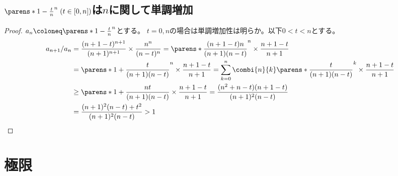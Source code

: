         \subsection{\texorpdfstring{$\parens*{1-\frac{t}{n}}^n\;(t\in[0,n])$}{(1-t/n)\string^n (t∈[0,n])}は\texorpdfstring{$n$}{n}に関して単調増加}
            \label{(1-t/n)^nは単調増加}
            \begin{proof}
                $a_n \coloneq \parens*{1-\frac{t}{n}}^n$とする。
                $t=0,n$の場合は単調増加性は明らか。以下$0<t<n$とする。
                \begin{align*}
                    a_{n+1}/a_n &= \frac{(n+1-t)^{n+1}}{(n+1)^{n+1}}\times\frac{n^n}{(n-t)^n} = \parens*{\frac{(n+1-t)n}{(n+1)(n-t)}}^n\times\frac{n+1-t}{n+1} \\
                    &= \parens*{1 + \frac{t}{(n+1)(n-t)}}^n\times\frac{n+1-t}{n+1} = \sum_{k=0}^n \combi{n}{k}\parens*{\frac{t}{(n+1)(n-t)}}^k \times \frac{n+1-t}{n+1} \\
                    &\geq \parens*{1 + \frac{nt}{(n+1)(n-t)}} \times \frac{n+1-t}{n+1} = \frac{(n^2+n-t)(n+1-t)}{(n+1)^2(n-t)} \\
                    &= \frac{(n+1)^2(n-t) + t^2}{(n+1)^2(n-t)} > 1
                \end{align*}
            \end{proof}
    \section{極限}
